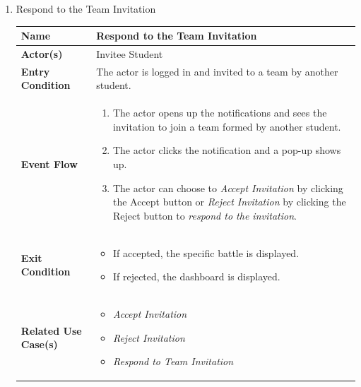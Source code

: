 \begin{enumerate}
\item Respond to the Team Invitation
\begin{center}
    \begin{tabular}{ | m{10em} | m{10cm}| } 
      \hline
      \textbf{Name} & Respond to the Team Invitation  \\ 
      \hline
      \textbf{Actor(s)} & Invitee Student \\ 
      \hline
      \textbf{Entry Condition} & The actor is logged in and invited to a team by another student.  \\ 
      \hline
      \textbf{Event Flow} & 
          \begin{enumerate}[(1)]
              \item The actor opens up the notifications and sees the invitation to join a team formed by another student.
              \item The actor clicks the notification and a pop-up shows up.
              \item The actor can choose to \textit{Accept Invitation} by clicking the Accept button or \textit{Reject Invitation} by clicking the Reject button to \textit{respond to the invitation}.
          \end{enumerate}
      \\ 
      \hline
      \textbf{Exit Condition} & 
      \begin{itemize}
          \item If accepted, the specific battle is displayed.
          \item If rejected, the dashboard is displayed.
      \end{itemize}\\ 
      \hline
      \textbf{Related Use Case(s)} & 
      \begin{itemize}
          \item \textit{Accept Invitation}
          \item \textit{Reject Invitation}
          \item \textit{Respond to Team Invitation}
      \end{itemize}
          \\ 
      \hline
    \end{tabular}
        \label{tbl:uc13}
\end{center}



\newpage


\end{enumerate}
